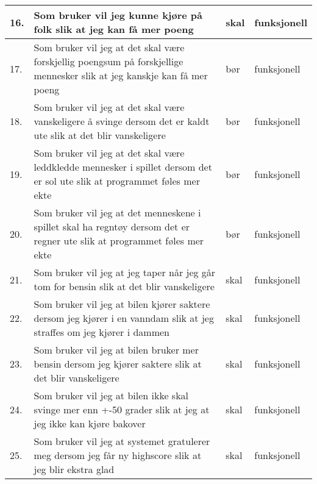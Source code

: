 \documentclass[fontsize=11pt]{scrartcl}
\begin{document}
\begin{center}
\begin{tabular}{ | m{0.4cm} | m{7cm} | m{2.5cm} | m{3cm} | }
\end{tabular}

\begin{tabular}{ | m{0.4cm} | m{7cm} | m{2cm} | m{2cm} | }
\hline


16. & Som bruker vil jeg kunne kjøre på folk slik at jeg kan få mer poeng 
& skal & funksjonell 
\\ \hline
17. & Som bruker vil jeg at det skal være forskjellig poengsum på forskjellige
mennesker slik at jeg kanskje kan få mer poeng & bør & funksjonell 
\\ \hline
18. & Som bruker vil jeg at det skal være vanskeligere å svinge dersom det er
kaldt ute slik at det blir vanskeligere & bør & funksjonell 
\\ \hline
19. & Som bruker vil jeg at det skal være leddkledde mennesker i spillet dersom
det er sol ute slik at programmet føles mer ekte & bør & funksjonell
\\ \hline
20. & Som bruker vil jeg at det menneskene i spillet skal ha regntøy dersom
det er regner ute slik at programmet føles mer ekte & bør & funksjonell
\\ \hline
21. & Som bruker vil jeg at jeg taper når jeg går tom for bensin slik at det
blir vanskeligere & skal & funksjonell
\\ \hline
22. & Som bruker vil jeg at bilen kjører saktere dersom jeg kjører i en vanndam
slik at jeg straffes om jeg kjører i dammen & skal & funksjonell
\\ \hline
23. & Som bruker vil jeg at bilen bruker mer bensin dersom jeg kjører saktere
slik at det blir vanskeligere & skal & funksjonell
\\ \hline
24. & Som bruker vil jeg at bilen ikke skal svinge mer enn +-50 grader slik at
jeg at jeg ikke kan kjøre bakover & skal & funksjonell 
\\ \hline
25. & Som bruker vil jeg at systemet gratulerer meg dersom jeg får ny highscore
slik at jeg blir ekstra glad & skal & funksjonell 
\\ \hline
\end{tabular}
\end{center}
\end{document}

